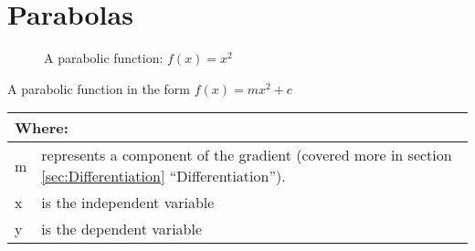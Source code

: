 \chapter{Parabolas}
\label{chap:Parabolas}
\begin{figure}[!hbt]
\label{fig:FuncGraphParabola}
\caption{A parabolic function: $f(x) = {x}^{2}$}
\end{figure}
A parabolic function in the form $f(x) = mx^2 + c$
\begin{table}[!hbt]
\label{tab:PartsOfAParabolicFunction}
\begin{tabularx}{\linewidth}{| l X |}
  \hline
  \multicolumn{2}{|l|}{Where:} \\
  \hline \hline
  m & represents a component of the gradient (covered more in section
  \ref{sec:Differentiation} ``Differentiation''). \\ x & is the independent
  variable\\ y & is the dependent variable\\
\hline
\end{tabularx}
\end{table}
